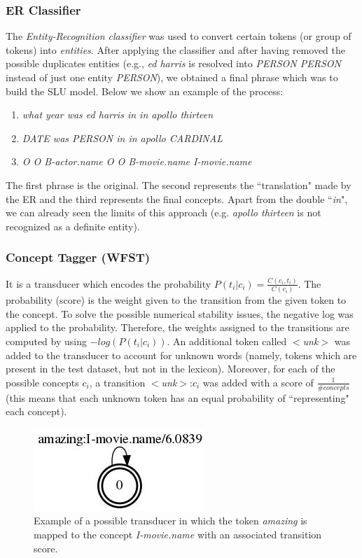 \documentclass[11pt,a4paper]{article}
\begin{document}
\subsubsection{ER Classifier}

The \textit{Entity-Recognition classifier} was used to convert certain tokens (or group of tokens) into \textit{entities}. After applying the classifier and after having removed the possible duplicates entities (e.g., \textit{ed harris} is resolved into \textit{PERSON PERSON} instead of just one entity \textit{PERSON}), we obtained a final phrase which was to build the SLU model. Below we show an example of the process:

\begin{enumerate}
\item \textit{what year was ed harris in in apollo thirteen}
\item \textit{DATE was PERSON in in apollo CARDINAL}
\item \textit{O O B-actor.name O O B-movie.name I-movie.name}
\end{enumerate}

The first phrase is the original. The second represents the ``translation" made by the ER and the third represents the final concepts. Apart from the double ``\textit{in}", we can already seen the limits of this approach (e.g. \textit{apollo thirteen} is not recognized as a definite entity). 

\subsubsection{Concept Tagger (WFST)}
It is a transducer which encodes the probability $P(t_i|c_i) = \frac{C(c_i, t_i)}{C(c_i)}$. The probability (score) is the weight given to the transition from the given token to the concept. To solve the possible numerical stability issues, the negative log was applied to the probability. Therefore, the weights assigned to the transitions are computed by using $-log(P(t_i|c_i))$. An additional token called $<$\textit{unk}$>$ was added to the transducer to account for unknown words (namely, tokens which are present in the test dataset, but not in the lexicon). Moreover, for each of the possible concepts $c_i$, a transition $<$\textit{unk}$>$:$c_i$ was added with a score of $\frac{1}{\#concepts}$ (this means that each unknown token has an equal probability of ``representing" each concept). 

\begin{figure}[b!]
	\centering
	\includegraphics[width=0.5\linewidth]{img/pos-tagger}
	\caption{Example of a possible transducer in which the token \textit{amazing} is mapped to the concept \textit{I-movie.name} with an associated transition score.}
\end{figure}
\end{document}
